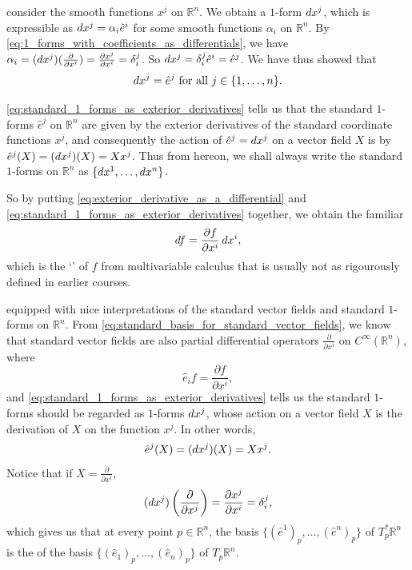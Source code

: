\documentclass[notoc,notitlepage]{tufte-book}
\begin{document}
 consider the smooth functions $x^j$ on $\mathbb{R}^n$. We obtain a $1$-form
$\mathop{}\!d{x^j}$, which is expressible as $\mathop{}\!d{x^j} = \alpha_i \hat{e}^i$ for some smooth functions
$\alpha_i$ on $\mathbb{R}^n$. By \cref{eq:1_forms_with_coefficients_as_differentials}, we have
$\alpha_i = (\mathop{}\!d{x}^j)(\frac{\partial}{\partial x^i}) = \frac{\partial x^j}{\partial x^i} =
\delta_i^j$. So $\mathop{}\!d{x^j} = \delta_i^j \hat{e}^i = \hat{e}^j$. We have thus showed that
\begin{equation}\label{eq:standard_1_forms_as_exterior_derivatives}
  \mathop{}\!d{x^j} = \hat{e}^j \text{ for all } j \in \{ 1, \ldots, n \}.
\end{equation}

\cref{eq:standard_1_forms_as_exterior_derivatives} tells us that the standard $1$-forms $\hat{e}^j$
on $\mathbb{R}^n$ are given by the exterior derivatives of the standard coordinate functions $x^j$,
and consequently the action of $\hat{e}^j = \mathop{}\!d{x^j}$ on a vector field $X$ is by $\hat{e}^j(X)
= (\mathop{}\!d{x^j})(X) = X x^j$. Thus from hereon, we shall always write the standard $1$-forms on
$\mathbb{R}^n$ as $\{ \mathop{}\!d{x^1}, \ldots, \mathop{}\!d{x^n} \}$.

So by putting \cref{eq:exterior_derivative_as_a_differential} and
\cref{eq:standard_1_forms_as_exterior_derivatives} together, we obtain the familiar
\begin{equation}\label{eq:differential_of_f_from_multivar_calc}
  \mathop{}\!d{f} = \frac{\partial f}{\partial x^i} \mathop{}\!d{x^i},
\end{equation}
which is the `' of $f$ from multivariable calculus that is usually not
as rigourously defined in earlier courses.

 equipped with nice interpretations of the standard vector fields
and standard $1$-forms on $\mathbb{R}^n$. From \cref{eq:standard_basis_for_standard_vector_fields},
we know that standard vector fields are also partial differential operators 
$\frac{\partial}{\partial x^i}$ on $C^\infty(\mathbb{R}^n)$, where
\begin{equation*}
  \hat{e}_i f = \frac{\partial f}{\partial x^i},
\end{equation*}
and \cref{eq:standard_1_forms_as_exterior_derivatives} tells us the standard $1$-forms should be
regarded as $1$-forms $\mathop{}\!d{x^j}$, whose action on a vector field $X$ is the derivation of $X$
on the function $x^j$. In other words,
\begin{equation*}
  \hat{e}^j(X) = (\mathop{}\!d{x^j})(X) = X x^j.
\end{equation*}
Notice that if $X = \frac{\partial}{\partial x^i}$,
\begin{equation*}
  (\mathop{}\!d{x^j})\left( \frac{\partial}{\partial x^j} \right) = \frac{\partial x^j}{\partial x^i}
    = \delta_i^j,
\end{equation*}
which gives us that at every point $p \in \mathbb{R}^n$, the basis $\{ (\hat{e}^1)_p, \ldots,
  (\hat{e}^n)_p \}$ of $T_p^* \mathbb{R}^n$ is the  of the basis $\{
(\hat{e}_1)_p, \ldots, (\hat{e}_n)_p \}$ of $T_p \mathbb{R}^n$. 
\end{document}
